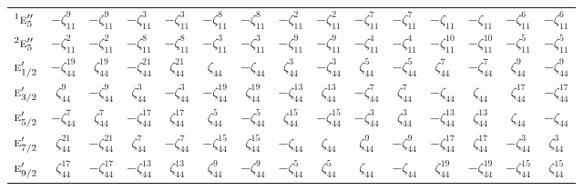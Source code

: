 \documentclass[10pt,a4paper]{article}
\makeatletter
\def\grouprule#1#2{\noalign{\marks\LTgroupmarks{\the\belowrulesep}\nobreak\vskip#1%
  \vskip\aboverulesep}\multispan\LT@cols\unskip{\leaders\hrule\@height#2\hfill\kern\z@}\cr
  \noalign{\penalty\LTrulebreak\vskip\belowrulesep\global\@lastruleclass\z@}}
\numberwithin{equation}{section}
\newcommand{\irr}[1]{\text{\normalfont\scshape #1}}
\newcommand{\conjpair}[1]{{}^{#1}}
\newcommand{\rootunity}[1]{\zeta_{#1}}
\makeatother
\begin{document}
{\begin{longtable}{@{}lcccccccccccccc@{}}
$\conjpair{1}\irr{e}_{5}''$ & $-\rootunity{11}^{9}$ & $-\rootunity{11}^{9}$ & $-\rootunity{11}^{3}$ & $-\rootunity{11}^{3}$ & $-\rootunity{11}^{8}$ & $-\rootunity{11}^{8}$ & $-\rootunity{11}^{2}$ & $-\rootunity{11}^{2}$ & $-\rootunity{11}^{7}$ & $-\rootunity{11}^{7}$ & $-\rootunity{11}$ & $-\rootunity{11}$ & $-\rootunity{11}^{6}$ & $-\rootunity{11}^{6}$\\
$\conjpair{2}\irr{e}_{5}''$ & $-\rootunity{11}^{2}$ & $-\rootunity{11}^{2}$ & $-\rootunity{11}^{8}$ & $-\rootunity{11}^{8}$ & $-\rootunity{11}^{3}$ & $-\rootunity{11}^{3}$ & $-\rootunity{11}^{9}$ & $-\rootunity{11}^{9}$ & $-\rootunity{11}^{4}$ & $-\rootunity{11}^{4}$ & $-\rootunity{11}^{10}$ & $-\rootunity{11}^{10}$ & $-\rootunity{11}^{5}$ & $-\rootunity{11}^{5}$\\
\grouprule{0pt}{\lightrulewidth}
$\irr{e}_{1/2}'$ & $-\rootunity{44}^{19}$ & $\rootunity{44}^{19}$ & $-\rootunity{44}^{21}$ & $\rootunity{44}^{21}$ & $\rootunity{44}$ & $-\rootunity{44}$ & $\rootunity{44}^{3}$ & $-\rootunity{44}^{3}$ & $\rootunity{44}^{5}$ & $-\rootunity{44}^{5}$ & $\rootunity{44}^{7}$ & $-\rootunity{44}^{7}$ & $\rootunity{44}^{9}$ & $-\rootunity{44}^{9}$\\
$\irr{e}_{3/2}'$ & $\rootunity{44}^{9}$ & $-\rootunity{44}^{9}$ & $\rootunity{44}^{3}$ & $-\rootunity{44}^{3}$ & $-\rootunity{44}^{19}$ & $\rootunity{44}^{19}$ & $-\rootunity{44}^{13}$ & $\rootunity{44}^{13}$ & $-\rootunity{44}^{7}$ & $\rootunity{44}^{7}$ & $-\rootunity{44}$ & $\rootunity{44}$ & $\rootunity{44}^{17}$ & $-\rootunity{44}^{17}$\\
$\irr{e}_{5/2}'$ & $-\rootunity{44}^{7}$ & $\rootunity{44}^{7}$ & $-\rootunity{44}^{17}$ & $\rootunity{44}^{17}$ & $\rootunity{44}^{5}$ & $-\rootunity{44}^{5}$ & $\rootunity{44}^{15}$ & $-\rootunity{44}^{15}$ & $-\rootunity{44}^{3}$ & $\rootunity{44}^{3}$ & $-\rootunity{44}^{13}$ & $\rootunity{44}^{13}$ & $\rootunity{44}$ & $-\rootunity{44}$\\
$\irr{e}_{7/2}'$ & $\rootunity{44}^{21}$ & $-\rootunity{44}^{21}$ & $\rootunity{44}^{7}$ & $-\rootunity{44}^{7}$ & $-\rootunity{44}^{15}$ & $\rootunity{44}^{15}$ & $-\rootunity{44}$ & $\rootunity{44}$ & $\rootunity{44}^{9}$ & $-\rootunity{44}^{9}$ & $-\rootunity{44}^{17}$ & $\rootunity{44}^{17}$ & $-\rootunity{44}^{3}$ & $\rootunity{44}^{3}$\\
$\irr{e}_{9/2}'$ & $\rootunity{44}^{17}$ & $-\rootunity{44}^{17}$ & $-\rootunity{44}^{13}$ & $\rootunity{44}^{13}$ & $\rootunity{44}^{9}$ & $-\rootunity{44}^{9}$ & $-\rootunity{44}^{5}$ & $\rootunity{44}^{5}$ & $\rootunity{44}$ & $-\rootunity{44}$ & $\rootunity{44}^{19}$ & $-\rootunity{44}^{19}$ & $-\rootunity{44}^{15}$ & $\rootunity{44}^{15}$\\

\end{longtable}}
\end{document}
